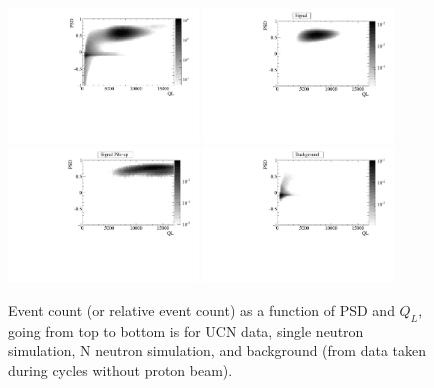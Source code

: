 \documentclass[letter,twocolumn,preprint,3p]{elsarticle}
\begin{document}
\begin{figure}[!htpb]
\centering
\includegraphics[width=0.45\textwidth]{figures/2DGrayscale.pdf}
\includegraphics[width=0.45\textwidth]{figures/hsig_psdql.pdf}
\includegraphics[width=0.45\textwidth]{figures/hsigpile_psdql.pdf}
\includegraphics[width=0.45\textwidth]{figures/hbg_psdql.pdf}
\caption{ Event count (or relative event count) as a function of PSD
  and $Q_L$, going from top to bottom is for UCN data,
  single neutron simulation, N neutron simulation, and background (from
  data taken during cycles without proton beam).} \label{fig:eventSpectra}
\end{figure}
\end{document}
